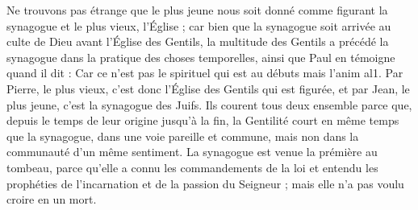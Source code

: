  Ne trouvons pas étrange que le plus jeune nous soit donné comme figurant la synagogue et le plus vieux, l’Église ; car bien que la synagogue soit arrivée au culte de Dieu avant l’Église des Gentils, la multitude des Gentils a précédé la synagogue dans la pratique des choses temporelles, ainsi que Paul en témoigne quand il dit : Car ce n'est pas le spirituel qui est au débuts mais l'anim al1. Par Pierre, le plus vieux, c’est donc l’Église des Gentils qui est figurée, et par Jean, le plus jeune, c’est la synagogue des Juifs. Ils courent tous deux ensemble parce que, depuis le temps de leur origine jusqu’à la fin, la Gentilité court en même temps que la synagogue, dans une voie pareille et commune, mais non dans la communauté d’un même sentiment. La synagogue est venue la prémière au tombeau, parce qu’elle a connu les commandements de la loi et entendu les prophéties de l’incarnation et de la passion du Seigneur ; mais elle n’a pas voulu croire en un mort.